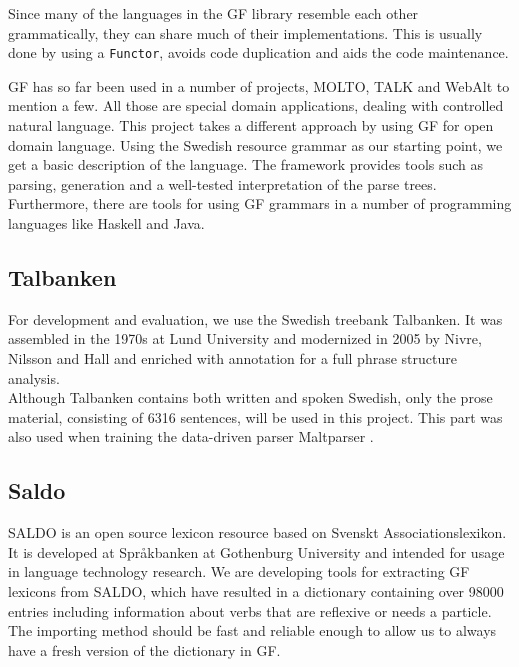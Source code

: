 \documentclass[submission]{eptcs} %
\begin{document}
Since many of the languages in the GF library resemble each other grammatically,
they can share much of their implementations. This is usually done by using a
\verb|Functor|, %
avoids code duplication and aids the code maintenance.

GF has so far been used in a number of projects, MOLTO\cite{molto}, TALK\cite{talk}
and WebAlt\cite{webalt} to mention a few. 
All those are special domain applications, dealing with controlled natural
language.
This project takes a different approach by using GF for open domain language.
Using the Swedish resource grammar as our starting
point, %
we get a basic description of the language. The framework provides
tools such as parsing, generation and
a well-tested interpretation of the parse trees. Furthermore, there are tools
for using GF grammars in a number of programming languages like Haskell
and Java. 



\subsection{Talbanken}
For development and evaluation, we use the Swedish treebank
Talbanken\cite{talbanken}.
It was assembled in the 1970s at Lund University and modernized
in 2005 by Nivre, Nilsson and Hall\cite{talbanken05} and
enriched with annotation for a full phrase structure analysis.  \\
Although Talbanken contains both written and spoken Swedish,
only the prose material, consisting of 6316 sentences, will be used in this project.
This part was also used when training the data-driven parser Maltparser \cite{malt}. \\

\subsection{Saldo}
SALDO\cite{saldo} is an open source lexicon resource
based on Svenskt Associationslexikon. It is
developed at Språkbanken at Gothenburg University
and intended for usage in language technology
research. 
We are developing tools for extracting GF lexicons
from SALDO, which have resulted in a dictionary containing
over 98000 entries including information about verbs that
are reflexive or needs a particle.
The importing method should be fast and reliable
enough to allow us to always have a fresh version of the dictionary
in GF.
\end{document}
